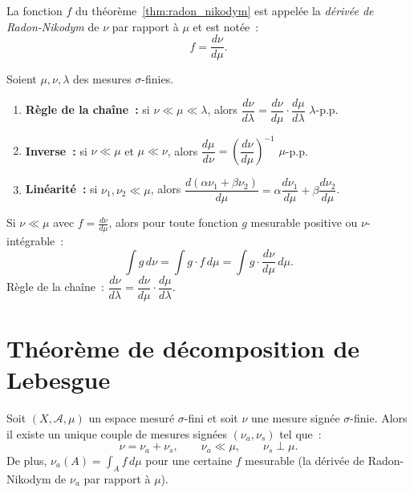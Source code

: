 \begin{definition}
La fonction $f$ du th\'eor\`eme~\ref{thm:radon_nikodym} est appel\'ee la
\emph{d\'eriv\'ee de Radon-Nikodym} de $\nu$ par rapport \`a $\mu$ et est not\'ee~:
\[
    f = \frac{d\nu}{d\mu}.
\]
\end{definition}

\begin{proposition}
\label{prop:rn_props}
Soient $\mu, \nu, \lambda$ des mesures $\sigma$-finies.
\begin{enumerate}
    \item \textbf{R\`egle de la cha\^ine~:} si $\nu \ll \mu \ll \lambda$, alors
    $\dfrac{d\nu}{d\lambda} = \dfrac{d\nu}{d\mu} \cdot \dfrac{d\mu}{d\lambda}$
    $\lambda$-p.p.
    \item \textbf{Inverse~:} si $\nu \ll \mu$ et $\mu \ll \nu$, alors
    $\dfrac{d\mu}{d\nu} = \left(\dfrac{d\nu}{d\mu}\right)^{-1}$ $\mu$-p.p.
    \item \textbf{Lin\'earit\'e~:} si $\nu_1, \nu_2 \ll \mu$, alors
    $\dfrac{d(\alpha\nu_1 + \beta\nu_2)}{d\mu} = \alpha\dfrac{d\nu_1}{d\mu}
    + \beta\dfrac{d\nu_2}{d\mu}$.
\end{enumerate}
\end{proposition}

\begin{formules}[title=\textbf{Formules cl\'es de Radon-Nikodym}]
Si $\nu \ll \mu$ avec $f = \frac{d\nu}{d\mu}$, alors pour toute fonction
$g$ mesurable positive ou $\nu$-int\'egrable~:
\[
    \int g\, d\nu = \int g \cdot f\, d\mu = \int g \cdot \frac{d\nu}{d\mu}\, d\mu.
\]
R\`egle de la cha\^ine~: $\dfrac{d\nu}{d\lambda} = \dfrac{d\nu}{d\mu} \cdot \dfrac{d\mu}{d\lambda}$.
\end{formules}

\section{Th\'eor\`eme de d\'ecomposition de Lebesgue}

\begin{theoreme}
\label{thm:lebesgue_decomp}
Soit $(X, \mathcal{A}, \mu)$ un espace mesur\'e $\sigma$-fini et soit $\nu$ une mesure
sign\'ee $\sigma$-finie. Alors il existe un unique couple de mesures sign\'ees
$(\nu_a, \nu_s)$ tel que~:
\[
    \nu = \nu_a + \nu_s, \qquad \nu_a \ll \mu, \qquad \nu_s \perp \mu.
\]
De plus, $\nu_a(A) = \int_A f\, d\mu$ pour une certaine $f$ mesurable (la d\'eriv\'ee
de Radon-Nikodym de $\nu_a$ par rapport \`a $\mu$).
\end{theoreme}

